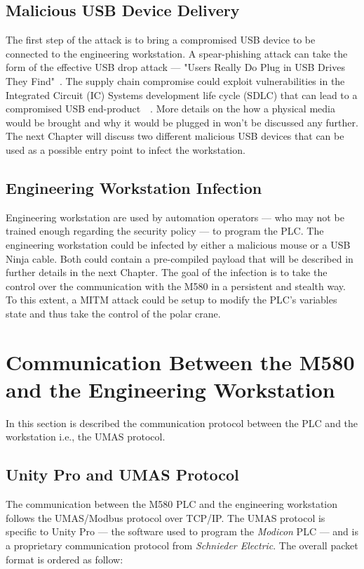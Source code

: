 \subsection{Malicious USB Device Delivery}

The first step of the attack is to bring a compromised USB device to be connected to the engineering workstation. A spear-phishing attack can take the form of the effective USB drop attack — "Users Really Do Plug in USB Drives They Find"~\cite{Tischer16}. The supply chain compromise could exploit vulnerabilities in the Integrated Circuit (IC) Systems development life cycle (SDLC) that can lead to a compromised USB end-product~\cite{Tun22}~\cite{Melnyk22}. More details on the how a physical media would be brought and why it would be plugged in won't be discussed any further. The next Chapter will discuss two different malicious USB devices that can be used as a possible entry point to infect the workstation. 

\subsection{Engineering Workstation Infection}

Engineering workstation are used by automation operators — who may not be trained enough regarding the security policy — to program the PLC. The engineering workstation could be infected by either a malicious mouse or a USB Ninja cable. Both could contain a pre-compiled payload that will be described in further details in the next Chapter. The goal of the infection is to take the control over the communication with the M580 in a persistent and stealth way. To this extent, a MITM attack could be setup to modify the PLC's variables state and thus take the control of the polar crane.

\section{Communication Between the M580 and the Engineering Workstation}

In this section is described the communication protocol between the PLC and the workstation i.e., the UMAS protocol.

\subsection{Unity Pro and UMAS Protocol}

The communication between the M580 PLC and the engineering workstation follows the UMAS/Modbus protocol over TCP/IP. The UMAS protocol is specific to Unity Pro — the software used to program the \emph{Modicon} PLC — and is a proprietary communication protocol from \emph{Schnieder Electric}. The overall packet format is ordered as follow:

